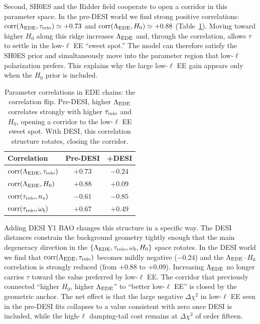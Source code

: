\documentclass[a4paper,11pt]{article}
\begin{document}
Second, SH0ES and the Ridder field cooperate to open a corridor in this parameter space. In the pre-DESI world we find strong positive correlations: $\mathrm{corr}(\Lambda_{\rm EDE}, \tau_{\rm reio}) \simeq +0.73$ and $\mathrm{corr}(\Lambda_{\rm EDE}, H_0) \simeq +0.88$ (Table~\ref{tab:correlation_flip}). Moving toward higher $H_0$ along this ridge increases $\Lambda_{\rm EDE}$ and, through the correlation, allows $\tau$ to settle in the low-$\ell$ EE ``sweet spot.'' The model can therefore satisfy the SH0ES prior and simultaneously move into the parameter region that low-$\ell$ polarization prefers. This explains why the large low-$\ell$ EE gain appears only when the $H_0$ prior is included.

\begin{table}[ht]
\centering
\caption{Parameter correlations in EDE chains: the correlation flip. Pre-DESI, higher $\Lambda_{\rm EDE}$ correlates strongly with higher $\tau_{\rm reio}$ and $H_0$, opening a corridor to the low-$\ell$ EE sweet spot. With DESI, this correlation structure rotates, closing the corridor.}
\label{tab:correlation_flip}
\begin{tabular}{lcc}
\toprule
\textbf{Correlation} & \textbf{Pre-DESI} & \textbf{+DESI} \\
\midrule
$\mathrm{corr}(\Lambda_{\rm EDE}, \tau_{\rm reio})$ & $\mathbf{+0.73}$ & $\mathbf{-0.24}$ \\
$\mathrm{corr}(\Lambda_{\rm EDE}, H_0)$ & $+0.88$ & $+0.09$ \\
$\mathrm{corr}(\tau_{\rm reio}, n_s)$ & $-0.61$ & $-0.85$ \\
$\mathrm{corr}(\tau_{\rm reio}, \omega_b)$ & $+0.67$ & $+0.49$ \\
\bottomrule
\end{tabular}
\end{table}

Adding DESI Y1 BAO changes this structure in a specific way. The DESI distances constrain the background geometry tightly enough that the main degeneracy direction in the $\{\Lambda_{\rm EDE}, \tau_{\rm reio}, \omega_b, H_0\}$ space rotates. In the DESI world we find that $\mathrm{corr}(\Lambda_{\rm EDE}, \tau_{\rm reio})$ becomes mildly negative ($-0.24$) and the $\Lambda_{\rm EDE}$--$H_0$ correlation is strongly reduced (from $+0.88$ to $+0.09$). Increasing $\Lambda_{\rm EDE}$ no longer carries $\tau$ toward the value preferred by low-$\ell$ EE. The corridor that previously connected ``higher $H_0$, higher $\Lambda_{\rm EDE}$'' to ``better low-$\ell$ EE'' is closed by the geometric anchor. The net effect is that the large negative $\Delta\chi^2$ in low-$\ell$ EE seen in the pre-DESI fits collapses to a value consistent with zero once DESI is included, while the high-$\ell$ damping-tail cost remains at $\Delta\chi^2$ of order fifteen.
\end{document}
